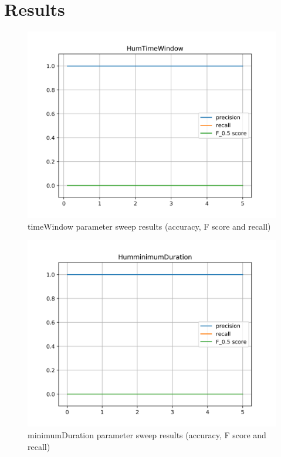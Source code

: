 
\chapter{Results}

\begin{figure}[!ht]
	\includegraphics[clip,width=\columnwidth]{Figures/HumTimeWindow.png}%
	\caption{timeWindow parameter sweep results (accuracy, F score and recall)}
	\label{fig:accomp}
\end{figure}

\begin{figure}[!ht]
	\includegraphics[clip,width=\columnwidth]{Figures/HumminimumDuration.png}%
	\caption{minimumDuration parameter sweep results (accuracy, F score and recall)}
	\label{fig:accomp}
\end{figure}


